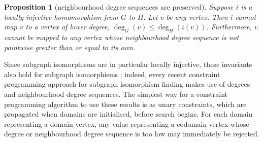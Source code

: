 \documentclass{article}
\newtheorem{proposition}{Proposition}
\newcommand{\degree}{\operatorname{deg}}
\begin{document}
\begin{proposition}[neighbourhood degree sequences are preserved]\label{proposition:degreends}
    Suppose  $i$ is a locally injective homomorphism from $G$ to  $H$. Let
    $v$ be any vertex. Then $i$ cannot map $v$ to a vertex of lower degree, $\degree_G(v) \le \degree_H(i(v))$.
    Furthermore, $v$ cannot be mapped to any vertex whose neighbourhood degree sequence is
            not pointwise greater than or equal to its own.
\end{proposition}
Since subgraph isomorphisms are in particular locally injective, these invariants also hold for
subgraph isomorphisms \cite{DBLP:journals/constraints/ZampelliDS10}; indeed, every recent constraint
programming approach for subgraph isomorphism finding makes use of degrees and neighbourhood degree
sequences. The simplest way for a constraint programming algorithm to use these results is as unary
constraints, which are propagated when domains are initialised, before search begins. For each
domain representing a domain vertex, any value representing a codomain vertex whose degree or
neighbourhood degree sequence is too low may immediately be rejected.
\end{document}
